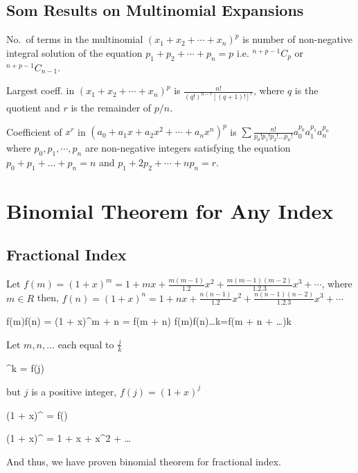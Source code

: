 \subsection{Som Results on Multinomial Expansions}
\startitemize[n]
\item No.\ of terms in the multinomial $(x_1 + x_2 + \cdots + x_n)^p$ is number of non-negative integral solution of the equation
  $p_1 + p_2 + \cdots + p_n = p$ i.e. ${}^{n + p - 1}C_{p}$ or ${}^{n + p - 1}C_{n - 1}$.
\item Largest coeff. in $(x_1 + x_2 + \cdots + x_n)^p$ is $\frac{n!}{(q!)^{n - r}[(q + 1)!]^r}$, where $q$ is the quotient and $r$
  is the remainder of $p/n$.
\item Coefficient of $x^r$ in $(a_0 + a_1x + a_2x^2 + \cdots + a_nx^n)^p$ is $\sum\frac{n!}{p_0!p_1!p_2!\ldots
  p_n!}a_0^{p_0}a_1^{p_1}a_n^{p_n}$ where $p_0, p_1, \cdots, p_n$ are non-negative integers satisfying the equation $p_0 + p_1 +
  \ldots + p_n = n$ and $p_1 + 2p_2 + \cdots + np_n = r.$
\stopitemize

\section{Binomial Theorem for Any Index}
\subsection{Fractional Index}
Let $f(m) = (1 + x)^m = 1 + mx + \frac{m(m- 1)}{1.2}x^2 + \frac{m(m - 1)(m - 2)}{1.2.3}x^3 + \cdots$, where $m\in R$ then, $f(n) =
(1 + x)^n = 1 + nx + \frac{n(n - 1)}{1.2}x^2 + \frac{n(n - 1)(n - 2)}{1.2.3}x^3 + \cdots$

\startformula f(m)f(n) = (1 + x)^{m + n} = f(m + n)\stopformula
\startformula f(m)f(n)\ldots{}k=f(m + n + \ldots)k\stopformula

Let $m, n, \ldots$ each equal to $\frac{j}{k}$

\startformula \Rightarrow {}^k = f(j)\stopformula

but $j$ is a positive integer, $f(j) = (1 + x)^j$

\startformula \therefore (1 + x)^{} = f\left(\right)\stopformula

\startformula \therefore (1 + x)^{} = 1 + x + x^2 + \ldots\stopformula

And thus, we have proven binomial theorem for fractional index.

